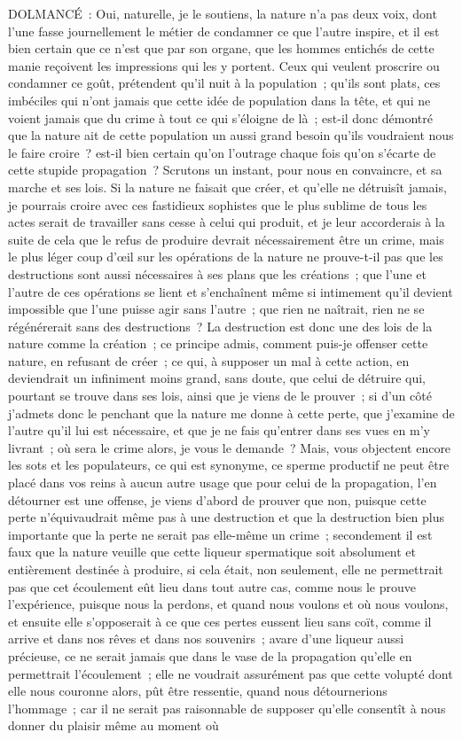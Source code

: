 \documentclass[french,twoside]{book} %
\begin{document}
DOLMANCÉ : Oui, naturelle, je le soutiens, la nature n’a pas deux voix, dont l’une fasse journellement le métier de condamner ce que l’autre inspire, et il est bien certain que ce n’est que par son organe, que les hommes entichés de cette manie reçoivent les impressions qui les y portent. Ceux qui veulent proscrire ou condamner ce goût, prétendent qu’il nuit à la population ; qu’ils sont plats, ces imbéciles qui n’ont jamais que cette idée de population dans la tête, et qui ne voient jamais que du crime à tout ce qui s’éloigne de là ; est-il donc démontré que la nature ait de cette population un aussi grand besoin qu’ils voudraient nous le faire croire ? est-il bien certain qu’on l’outrage chaque fois qu’on s’écarte de cette stupide propagation ? Scrutons un instant, pour nous en convaincre, et sa marche et ses lois. Si la nature ne faisait que créer, et qu’elle ne détruisît jamais, je pourrais croire avec ces fastidieux sophistes que le plus sublime de tous les actes serait de travailler sans cesse à celui qui produit, et je leur accorderais à la suite de cela que le refus de produire devrait nécessairement être un crime, mais le plus léger coup d’œil sur les opérations de la nature ne prouve-t-il pas que les destructions sont aussi nécessaires à ses plans que les créations ; que l’une et l’autre de ces opérations se lient et s’enchaînent même si intimement qu’il devient impossible que l’une puisse agir sans l’autre ; que rien ne naîtrait, rien ne se régénérerait sans des destructions ? La destruction est donc une des lois de la nature comme la création ; ce principe admis, comment puis-je offenser cette nature, en refusant de créer ; ce qui, à supposer un mal à cette action, en deviendrait un infiniment moins grand, sans doute, que celui de détruire qui, pourtant se trouve dans ses lois, ainsi que je viens de le prouver ; si d’un côté j’admets donc le penchant que la nature me donne à cette perte, que j’examine de l’autre qu’il lui est nécessaire, et que je ne fais qu’entrer dans ses vues en m’y livrant ; où sera le crime alors, je vous le demande ? Mais, vous objectent encore les sots et les populateurs, ce qui est synonyme, ce sperme productif ne peut être placé dans vos reins à aucun autre usage que pour celui de la propagation, l’en détourner est une offense, je viens d’abord de prouver que non, puisque cette perte n’équivaudrait même pas à une destruction et que la destruction bien plus importante que la perte ne serait pas elle-même un crime ; secondement il est faux que la nature veuille que cette liqueur spermatique soit absolument et entièrement destinée à produire, si cela était, non seulement, elle ne permettrait pas que cet écoulement eût lieu dans tout autre cas, comme nous le prouve l’expérience, puisque nous la perdons, et quand nous voulons et où nous voulons, et ensuite elle s’opposerait à ce que ces pertes eussent lieu sans coït, comme il arrive et dans nos rêves et dans nos souvenirs ; avare d’une liqueur aussi précieuse, ce ne serait jamais que dans le vase de la propagation qu’elle en permettrait l’écoulement ; elle ne voudrait assurément pas que cette volupté dont elle nous couronne alors, pût être ressentie, quand nous détournerions l’hommage ; car il ne serait pas raisonnable de supposer qu’elle consentît à nous donner du plaisir même au moment où 
\end{document}
